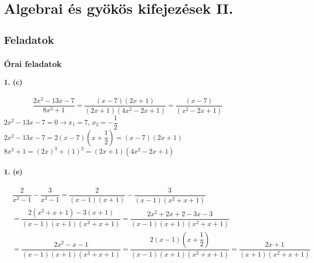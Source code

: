 \documentclass[12pt,a4paper,fleqn]{article}
\begin{document}
\section{Algebrai és gyökös kifejezések II.}
\setcounter{subsection}{1}
\subsection{Feladatok}
\subsubsection{Órai feladatok}
\textbf{1. (c)} \\\\
$$ \dfrac{2x^2-13x-7}{8x^3+1} = \dfrac{(x-7)(2x+1)}{(2x+1)(4x^2-2x+1)} = \dfrac{(x-7)}{(x^2-2x+1)}$$
$2x^2-13x-7=0 \rightarrow x_1 = 7$, $x_2 = -\dfrac{1}{2}$ \\
$2x^2-13x-7=2(x-7)(x+\dfrac{1}{2})=(x-7)(2x+1)$ \\
$ 8x^3 + 1 = (2x)^3 + (1)^3 = (2x+1)(4x^2-2x+1)$ \\\\
\textbf{1. (e)} \\\\
\begin{equation}
  \begin{split}
    & \dfrac{2}{x^2-1} -\dfrac{3}{x^3-1} = \dfrac{2}{(x-1)(x+1)} - \dfrac{3}{(x-1)(x^2+x+1)} \\[10pt]
    &= \dfrac{2(x^2+x+1)-3(x+1)}{(x-1)(x+1)(x^2+x+1)} = \dfrac{2x^2+2x+2-3x-3}{(x-1)(x+1)(x^2+x+1)} \\[10pt]
    &= \dfrac{2x^2-x-1}{(x-1)(x+1)(x^2+x+1)} = \dfrac{2(x-1)(x+\dfrac{1}{2})}{(x-1)(x+1)(x^2+x+1)} = \dfrac{2x+1}{(x+1)(x^2+x+1)}
  \end{split}
\end{equation}
\end{document}
